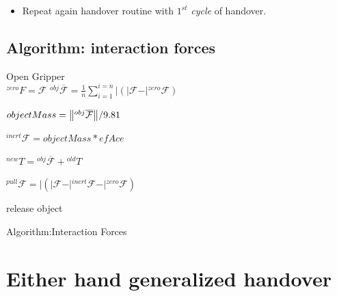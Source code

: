 \begin{itemize}
    \item Repeat again handover routine with $1^{st}$ \textit{cycle} of handover.
\end{itemize}

\clearpage

\subsection{Algorithm: interaction forces}
\begin{algorithm}[H]\label{interaction forces}
	\DontPrintSemicolon
	\SetNoFillComment
	
	
	{
		{
		    Open Gripper\\
			$\mathcal{}^{zero}{F}= \mathcal{F}$
		}
		${}^{obj}\overline{\mathcal{F}} = \frac{1}{n}\sum_{i=1}^{i=n} \vert{ (\vert{\mathcal{F}} - \vert{{}^{zero}\mathcal{F}}) }$
		
		$objectMass = \norm{{}^{obj}\overline{\mathcal{F}}}/9.81 $
		
		${}^{inert}\mathcal{F} = objectMass * efAce$ 
		
		${}^{new}T = {}^{obj}\overline{\mathcal{F}} + {}^{old}T$
		
		{	
			${}^{pull}\mathcal{F} = \vert{(\vert\mathcal{{F}} - \vert{}^{inert}\mathcal{{F}} - \vert{}^{zero}\mathcal{{F}}) }$
			
			{
				\textrm{release object}
			}
		}
	}
	\caption{Algorithm:Interaction Forces}
\end{algorithm}




\clearpage

\section{Either hand generalized handover}\label{both hands individual}

